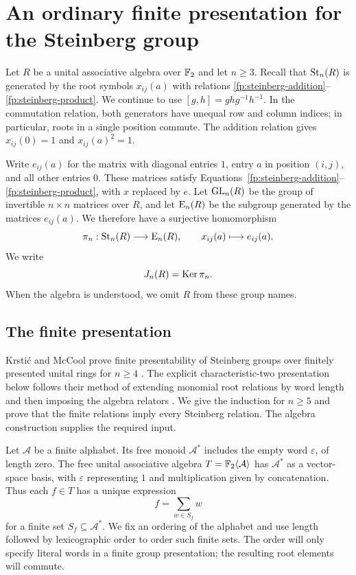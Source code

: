 \section{An ordinary finite presentation for the Steinberg group}
\label{sec:finite-presentation}

Let $R$ be a unital associative algebra over $\mathbb F_2$ and let $n\geq3$.
Recall that $\operatorname{St}_n(R)$ is generated by the root symbols $x_{ij}(a)$
with relations \eqref{fp:steinberg-addition}--\eqref{fp:steinberg-product}.
We continue to use $[g,h]=ghg^{-1}h^{-1}$. In the commutation relation,
both generators have unequal row and column indices; in particular,
roots in a single position commute. The addition relation gives
$x_{ij}(0)=1$ and $x_{ij}(a)^2=1$.

Write $e_{ij}(a)$ for the matrix with diagonal entries $1$, entry $a$ in
position $(i,j)$, and all other entries $0$.  These matrices satisfy
Equations~\eqref{fp:steinberg-addition}--\eqref{fp:steinberg-product},
with $x$ replaced by $e$.  Let $\operatorname{GL}_n(R)$ be the group of invertible
$n\times n$ matrices over $R$, and let $\operatorname{E}_n(R)$ be the subgroup generated
by the matrices $e_{ij}(a)$.  We therefore have a surjective homomorphism
\begin{equation}
 \pi_n:\operatorname{St}_n(R)\longrightarrow\operatorname{E}_n(R),\qquad
 x_{ij}(a)\longmapsto e_{ij}(a).
 \label{fp:matrix-map}
\end{equation}
We write
\begin{equation}
 J_n(R)=\operatorname{Ker}\pi_n.
 \label{fp:kernel-definition}
\end{equation}
When the algebra is understood, we omit $R$ from these group names.

\subsection{The finite presentation}

Krsti\'c and McCool prove finite presentability of Steinberg groups
over finitely presented unital rings for $n\geq4$
\cite[Theorem~3]{KrsticMcCool}. The explicit characteristic-two
presentation below follows their method of extending monomial root
relations by word length and then imposing the algebra relators
\cite[Section~3]{KrsticMcCool}. We give the induction for $n\geq5$
and prove that the finite relations imply every Steinberg relation.
The algebra construction supplies the required input.

Let $\mathcal A$ be a finite alphabet.  Its free monoid
$\mathcal A^*$ includes the empty word $\varepsilon$, of length zero.
The free unital associative algebra
$T=\mathbb F_2\langle\mathcal A\rangle$ has $\mathcal A^*$ as a vector-space
basis, with $\varepsilon$ representing $1$ and multiplication given by
concatenation.  Thus each $f\in T$ has a unique expression
\[
 f=\sum_{w\in S_f}w
\]
for a finite set $S_f\subseteq\mathcal A^*$.  We fix an ordering of the
alphabet and use length followed by lexicographic order to order such
finite sets.  The order will only specify literal words in a finite group
presentation; the resulting root elements will commute.

